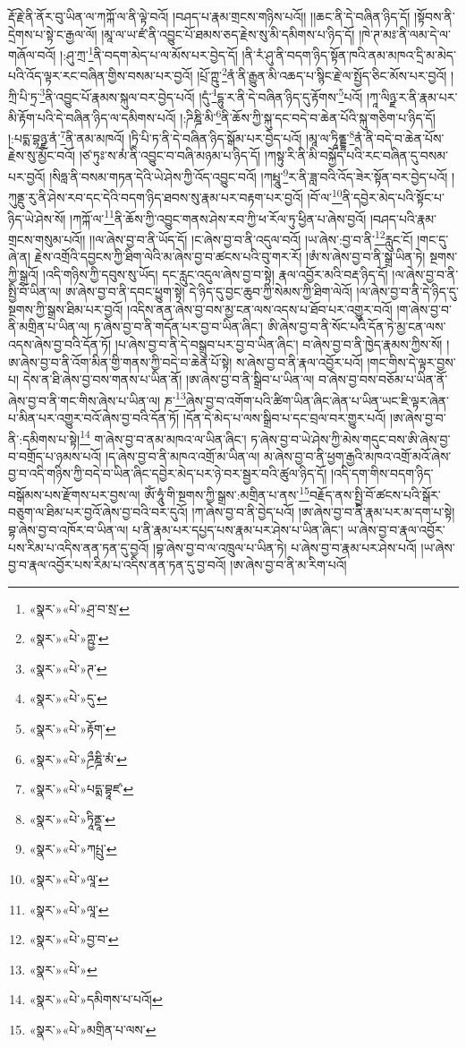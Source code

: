 རྡོ་རྗེ་ནི་ནོར་བུ་ཡིན་ལ་ཀཀྐོ་ལ་ནི་ལྟེ་བའོ། །བཤད་པ་རྣམ་གྲངས་གཉིས་པའོ།། །།ཆང་ནི་དེ་བཞིན་ཉིད་དོ། །སྟོབས་ནི་དྲེགས་པ་སྟེ་ང་རྒྱལ་ལོ། །མཱ་ལ་ཡ་ཛཾ་ནི་འབྱུང་པོ་ཐམས་ཅད་རྗེས་སུ་མི་དམིགས་པ་ཉིད་དོ། །ཁེ་ཊ་མཿ་ནི་ལམ་དེ་ལ་གཞོལ་བའོ། །:ཤུ་ཀྲ་\footnote{«སྣར་»«པེ་»ཤྲ་བ་སྲ་}ནི་བདག་མེད་པ་ལ་མོས་པར་བྱེད་དོ། །ནི་རཾ་ཤུ་ནི་བདག་ཉིད་སྟོན་ཁའི་ནམ་མཁའ་དྲི་མ་མེད་པའི་འོད་ལྟར་རང་བཞིན་གྱིས་བསམ་པར་བྱའོ། །པྲོ་ཀྵུ་\footnote{«སྣར་»«པེ་»ཀྵྱ་}ནཾ་ནི་རྒྱུན་མི་འཆད་པ་སྙིང་རྗེ་ལ་སྤྱོད་ཅིང་མོས་པར་བྱའོ། །ཀྲི་པི་ཏྲ་\footnote{«སྣར་»«པེ་»ཊ་}ནི་འབྱུང་པོ་རྣམས་སྐུལ་བར་བྱེད་པའོ། །དུཾ་\footnote{«སྣར་»«པེ་»དུ་}དྷུ་ར་ནི་དེ་བཞིན་ཉིད་དུ་རྟོགས་\footnote{«སྣར་»«པེ་»རྟོག་}པའོ། །ཀཱ་ལིཉྫ་ར་ནི་རྣམ་པར་མི་རྟོག་པའི་དེ་བཞིན་ཉིད་ལ་དམིགས་པའོ། །:ཌིཎྜི་མི་\footnote{«སྣར་»«པེ་»ཌྲྀཎྜི་མཾ་}ནི་ཆོས་ཀྱི་སྐུ་དང་བདེ་བ་ཆེན་པོའི་སྐུ་གཅིག་པ་ཉིད་དོ། །:པདྨ་བྷཉྫ་ནཾ་\footnote{«སྣར་»«པེ་»པདྨ་བྷཱཛ་}ནི་ནམ་མཁའོ། །ཏྲི་པི་ཏ་ནི་དེ་བཞིན་ཉིད་སྒོམ་པར་བྱེད་པའོ། །མཱ་ལ་ཏཱིནྡྷ་\footnote{«སྣར་»«པེ་»ཏཱིནྡཱ་}ནཾ་ནི་བདེ་བ་ཆེན་པོས་རྗེས་སུ་མྱོང་བའོ། །ཙ་ཏུཿ་ས་མཾ་ནི་འབྱུང་བ་བཞི་མཉམ་པ་ཉིད་དོ། །ཀསྟུ་རི་ནི་མི་བསྐྱོད་པའི་རང་བཞིན་དུ་བསམ་པར་བྱའོ། །སིཧླ་ནི་བསམ་གཏན་དེའི་ཡེ་ཤེས་ཀྱི་འོད་འབྱུང་བའོ། །ཀཔྤཱུ་\footnote{«སྣར་»«པེ་»ཀཔྤུ་}ར་ནི་ཟླ་བའི་འོད་ཟེར་སྟོན་བར་བྱེད་པའོ། །ཀུནྡུ་རུ་ནི་ཤེས་རབ་དང་དེའི་བདག་ཉིད་ཐབས་སུ་རྣམ་པར་བརྟག་པར་བྱའོ། །བོ་ལ་\footnote{«སྣར་»«པེ་»ལཱ་}ནི་དབྱེར་མེད་པའི་སྟོང་པ་ཉིད་ཡེ་ཤེས་སོ། །ཀཀྐོ་ལ་\footnote{«སྣར་»«པེ་»ལཱ་}ནི་ཆོས་ཀྱི་འབྱུང་གནས་ཤེས་རབ་ཀྱི་ཕ་རོལ་ཏུ་ཕྱིན་པ་ཞེས་བྱའོ། །བཤད་པའི་རྣམ་གྲངས་གསུམ་པའོ།། །།ལ་ཞེས་བྱ་བ་ནི་ཡོད་དོ། །ང་ཞེས་བྱ་བ་ནི་འདུལ་བའོ། །ཡ་ཞེས་:བྱ་བ་ནི་\footnote{«སྣར་»«པེ་»བྱ་བ་}རླུང་ངོ། །གང་དུ་ཞེ་ན། རྗེས་འགྲོའི་དབྱངས་ཀྱི་ཐིག་ལེའི་མ་ཞེས་བྱ་བ་ཚངས་པའི་བུ་གར་རོ། །ཨཾ་ས་ཞེས་བྱ་བ་ནི་སྒྲ་ཡིན་ཏེ། སྔགས་ཀྱི་སྒྲའོ། །འདི་གཉིས་ཀྱི་དབུས་སུ་ཡོད། དང་རླུང་འདུལ་ཞེས་བྱ་བ་སྟེ། རྣལ་འབྱོར་མའི་བརྡ་ཉིད་དོ། །ལ་ཞེས་བྱ་བ་ནི་སྤྱི་བོ་ཡིན་ལ། ཨ་ཞེས་བྱ་བ་ནི་དབང་ཕྱུག་སྟེ། དེ་ཉིད་དུ་བྱང་ཆུབ་ཀྱི་སེམས་ཀྱི་ཐིག་ལེའོ། །ལ་ཞེས་བྱ་བ་ནི་དེ་ཉིད་དུ་སྔགས་ཀྱི་སྒྲས་ཐིམ་པར་བྱའོ། །འདིས་ནན་ཞེས་བྱ་བས་མྱ་ངན་ལས་འདས་པ་ཐོབ་པར་འགྱུར་བའོ། །ག་ཞེས་བྱ་བ་ནི་མགྲིན་པ་ཡིན་ལ། ཏ་ཞེས་བྱ་བ་ནི་གདོན་པར་བྱ་བ་ཡིན་ཞིང་། ཨི་ཞེས་བྱ་བ་ནི་སོང་པའི་དོན་ཏེ་མྱ་ངན་ལས་འདས་ཞེས་བྱ་བའི་དོན་ཏོ། །པ་ཞེས་བྱ་བ་ནི་དེ་བསྒྲུབ་པར་བྱ་བ་ཡིན་ཞིང་། བ་ཞེས་བྱ་བ་ནི་ཁྱེད་རྣམས་ཀྱིས་སོ། །ཨ་ཞེས་བྱ་བ་ནི་འོག་མིན་གྱི་གནས་ཀྱི་བདེ་བ་ཆེན་པོ་སྟེ། ས་ཞེས་བྱ་བ་ནི་རྣལ་འབྱོར་པའོ། །གང་གིས་དེ་ལྟར་བྱས་པ། དེས་ན་ཐི་ཞེས་བྱ་བས་གནས་པ་ཡིན་ནོ། །ཨ་ཞེས་བྱ་བ་ནི་སྒྲིབ་པ་ཡིན་ལ། བ་ཞེས་བྱ་བས་བཅོམ་པ་ཡིན་ནོ་ཞེས་བྱ་བ་ནི་གང་གིས་ཞེས་པ་ཡིན་ལ། ཎ་\footnote{«སྣར་»«པེ་»}ཞེས་བྱ་བ་འགོག་པའི་ཚིག་ཡིན་ཞིང་ཞེན་པ་ཡིན་ཡང་ཇི་ལྟར་ཞེན་པ་མིན་པར་འགྱུར་བའོ་ཞེས་བྱ་བའི་དོན་ཏོ། །དོན་དེ་མེད་པ་ལས་སྒྲིབ་པ་དང་བྲལ་བར་གྱུར་པའོ། །ཨ་ཞེས་བྱ་བ་ནི་:དམིགས་པ་སྟེ།\footnote{«སྣར་»«པེ་»དམིགས་པ་པའོ།} ག་ཞེས་བྱ་བ་ནམ་མཁའ་ལ་ཡིན་ཞིང་། ཏ་ཞེས་བྱ་བ་ཡེ་ཤེས་ཀྱི་མེས་གདུང་བས་ཨི་ཞེས་བྱ་བ་བགྲོད་པ་ཉམས་པའོ། །ད་ཞེས་བྱ་བ་ནི་མཁའ་འགྲོ་མ་ཡིན་ལ། མ་ཞེས་བྱ་བ་ནི་ཕྱག་རྒྱའི་མཁའ་འགྲོ་མའོ་ཞེས་བྱ་བ་འདི་གཉིས་ཀྱི་བདེ་བ་ཡིན་ཞིང་དབྱེར་མེད་པར་ཉེ་བར་སྦྱར་བའི་ཚུལ་ཉིད་དོ། །འདི་དག་གིས་བདག་ཉིད་བསྒོམས་པས་རྫོགས་པར་བྱས་ལ། ཨོཾ་ཧཱུཾ་གི་སྔགས་ཀྱི་སྒྲས་:མགྲིན་པ་ནས་\footnote{«སྣར་»«པེ་»མགྲིན་པ་ལས་}བརྗོད་ནས་སྤྱི་བོ་ཚངས་པའི་སྒོར་བཅུག་ལ་ཐིམ་པར་བྱའོ་ཞེས་བྱ་བའི་བར་དུའོ། །ཀ་ཞེས་བྱ་བ་ནི་བྱེད་པའོ། །ཨ་ཞེས་བྱ་བ་ནི་རྣམ་པར་མ་དག་པ་སྟེ། བྷ་ཞེས་བྱ་བ་འཁོར་བ་ཡིན་ལ། པ་ནི་རྣམ་པར་དཔྱད་པས་རྣམ་པར་ཤེས་པ་ཡིན་ཞིང་། ཡ་ཞེས་བྱ་བ་རྣལ་འབྱོར་པས་རིམ་པ་འདིས་ནན་ཏན་དུ་བྱའོ། །བྷ་ཞེས་བྱ་བ་ལ་འཁྲུལ་པ་ཡིན་ཏེ། པ་ཞེས་བྱ་བ་རྣམ་པར་ཤེས་པའོ། །ཡ་ཞེས་བྱ་བ་རྣལ་འབྱོར་པས་རིམ་པ་འདིས་ནན་ཏན་དུ་བྱ་བའོ། །ཨ་ཞེས་བྱ་བ་ནི་མ་རིག་པའོ། 